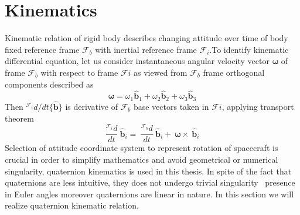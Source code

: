 \section{Kinematics}
Kinematic relation of rigid body describes changing attitude over time of body fixed reference frame $\displaystyle \mathcal{F}_{b}$ with inertial reference frame $\displaystyle \mathcal{F}_{i}$.To identify kinematic differential equation, let us consider instantaneous angular velocity vector $\displaystyle \mathbf{\omega }$ of frame $\displaystyle \mathcal{F}_{b}$ with respect to frame $\displaystyle \mathcal{F} i$ as viewed from $\displaystyle \mathcal{F}_{b}$ frame orthogonal components described as
\begin{equation*}
\mathbf{\omega } =\omega _{1}\hat{\mathbf{b}}_{1} +\omega _{2}\hat{\mathbf{b}}_{2} +\omega _{3}\hat{\mathbf{b}}_{3}
\end{equation*}
Then $\displaystyle ^{\mathcal{F}_{i}} d/dt\{\hat{\mathbf{b}}\}$ is derivative of $\displaystyle \mathcal{F}_{b}$ base vectors taken in $\displaystyle \mathcal{F} i$, applying transport theorem
\begin{equation}
\frac{^{\mathcal{F}_{i}} d}{dt} \ \hat{\mathbf{b}}_{i} =\ \frac{^{\mathcal{F}_{b}} d}{dt} \ \hat{\mathbf{b}}_{i} +\ \mathbf{\omega } \times \ \hat{\mathbf{b}}_{i}
\end{equation}
Selection of attitude coordinate system to represent rotation of spacecraft is crucial in order to simplify mathematics and avoid geometrical or numerical singularity, quaternion kinematics is used in this thesis. In spite of the fact that quaternions are less intuitive, they does not undergo trivial singularity \ presence in Euler angles moreover quaternions are linear in nature. In this section we will realize quaternion kinematic relation.

